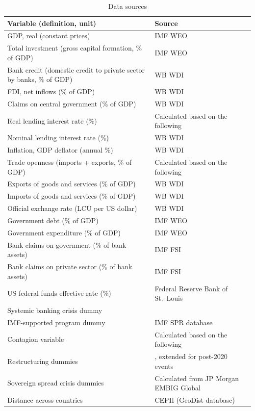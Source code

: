 \documentclass[12pt]{article}
\begin{document}
\begin{table}[th]
\centering
\caption{Data sources}
\label{tab:A3}
\small
\begin{tabular}{p{11.3cm}p{4cm}}
\toprule
Variable (definition, unit) & Source \\
\midrule
GDP, real (constant prices) & IMF WEO \\
\hline
Total investment (gross capital formation, \% of GDP) & IMF WEO \\
\hline
Bank credit (domestic credit to private sector by banks, \% of GDP) & WB WDI \\
\hline
FDI, net inflows (\% of GDP) & WB WDI \\
\hline
Claims on central government (\% of GDP) & WB WDI \\
\hline
Real lending interest rate (\%) & Calculated based on the following \\
\quad Nominal lending interest rate (\%) & WB WDI \\
\quad Inflation, GDP deflator (annual \%) & WB WDI \\
\hline
Trade openness (imports + exports, \% of GDP) & Calculated based on the following \\
\quad Exports of goods and services (\% of GDP) & WB WDI \\
\quad Imports of goods and services (\% of GDP) & WB WDI \\
\hline
Official exchange rate (LCU per US dollar) & WB WDI \\
\hline
Government debt (\% of GDP) & IMF WEO \\
\hline
Government expenditure (\% of GDP) & IMF WEO \\
\hline
Bank claims on government (\% of bank assets) & IMF FSI \\
\hline
Bank claims on private sector (\% of bank assets) & IMF FSI \\
\hline
US federal funds effective rate (\%) & Federal Reserve Bank of St.\ Louis \\
\hline
Systemic banking crisis dummy & \citet{laeven2013systemic,laeven2026systemic} \\
\hline
IMF-supported program dummy & IMF SPR database \\
\hline
Contagion variable & Calculated based on the following \\
\quad Restructuring dummies & \citet{asonuma2016sovereign}, extended for post-2020 events \\
\quad Sovereign spread crisis dummies & Calculated from JP Morgan EMBIG Global \\
\quad Distance across countries & CEPII (GeoDist database) \\
\bottomrule
\end{tabular}
\end{table}
\end{document}
